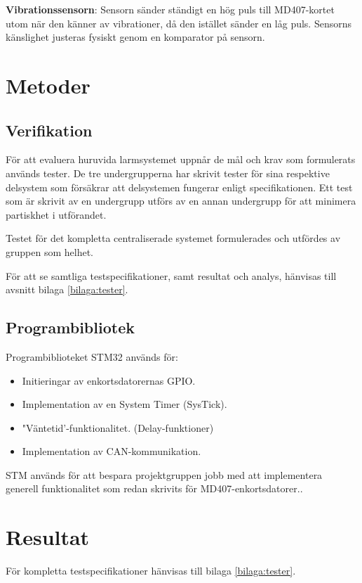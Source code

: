 \documentclass{article}
\begin{document}
\textbf{Vibrationssensorn}: Sensorn sänder ständigt en hög puls till MD407-kortet utom när den känner av vibrationer, då den istället sänder en låg puls. 
Sensorns känslighet justeras fysiskt genom en komparator på sensorn.




\section{Metoder}
\label{stm}
\subsection{Verifikation}
För att evaluera huruvida larmsystemet uppnår de mål och krav som formulerats används tester. 
De tre undergrupperna har skrivit tester för sina respektive delsystem som försäkrar att 
delsystemen fungerar enligt specifikationen. Ett test som är skrivit av en undergrupp utförs
av en annan undergrupp för att minimera partiskhet i utförandet. 

Testet för det kompletta centraliserade systemet formulerades och utfördes av gruppen som helhet.

För att se samtliga testspecifikationer, samt resultat och analys, hänvisas till avsnitt bilaga \ref{bilaga:tester}.


\subsection{Programbibliotek}
\label{stm}
Programbiblioteket STM32\cite{stm} används för:
\begin{itemize}
    \item Initieringar av enkortsdatorernas GPIO.
    \item Implementation av en System Timer (SysTick).
    \item "Väntetid'-funktionalitet. (Delay-funktioner)
    \item Implementation av CAN-kommunikation.
\end{itemize}

STM används för att bespara projektgruppen jobb med att implementera \\ generell funktionalitet
 som redan skrivits för MD407-enkortsdatorer.. 

 \section{Resultat}
 För kompletta testspecifikationer hänvisas till bilaga \ref{bilaga:tester}.
 
\end{document}
